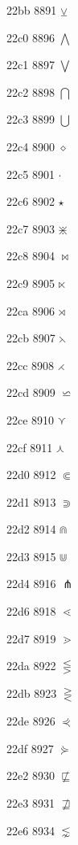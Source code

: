 \documentclass[11pt]{article}
\begin{document}
22bb 8891 \ensuremath{\veebar}


22c0 8896 \ensuremath{\bigwedge}

22c1 8897 \ensuremath{\bigvee}

22c2 8898 \ensuremath{\bigcap}

22c3 8899 \ensuremath{\bigcup}

22c4 8900 \ensuremath{\diamond}

22c5 8901 \ensuremath{\cdot}

22c6 8902 \ensuremath{\star}

22c7 8903 \ensuremath{\divideontimes}

22c8 8904 \ensuremath{\bowtie}

22c9 8905 \ensuremath{\ltimes}

22ca 8906 \ensuremath{\rtimes}

22cb 8907 \ensuremath{\leftthreetimes}

22cc 8908 \ensuremath{\rightthreetimes}

22cd 8909 \ensuremath{\backsimeq}

22ce 8910 \ensuremath{\curlyvee}

22cf 8911 \ensuremath{\curlywedge}

22d0 8912 \ensuremath{\Subset}

22d1 8913 \ensuremath{\Supset}

22d2 8914 \ensuremath{\Cap}

22d3 8915 \ensuremath{\Cup}

22d4 8916 \ensuremath{\pitchfork}

22d6 8918 \ensuremath{\lessdot}

22d7 8919 \ensuremath{\gtrdot}



22da 8922 \ensuremath{\lesseqgtr}

22db 8923 \ensuremath{\gtreqless}

22de 8926 \ensuremath{\curlyeqprec}

22df 8927 \ensuremath{\curlyeqsucc}

22e2 8930 \ensuremath{\not\sqsubseteq}

22e3 8931 \ensuremath{\not\sqsupseteq}


22e6 8934 \ensuremath{\lnsim}
\end{document}
